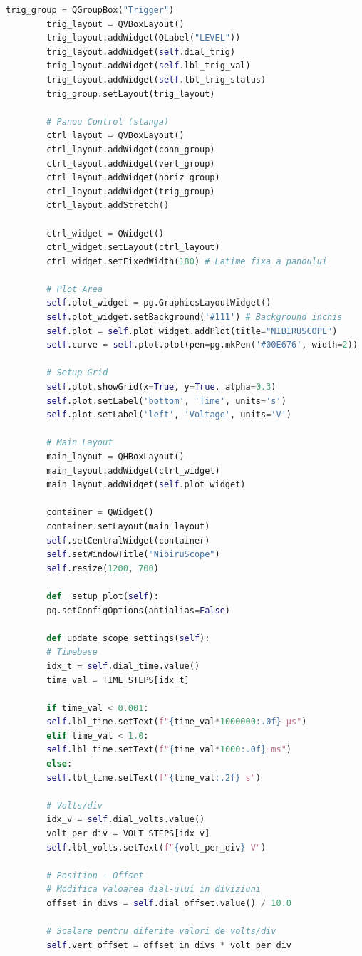 \documentclass[12pt,a4paper]{report}
\begin{document}
\begin{lstlisting}[language=Python]
		trig_group = QGroupBox("Trigger")
		trig_layout = QVBoxLayout()
		trig_layout.addWidget(QLabel("LEVEL"))
		trig_layout.addWidget(self.dial_trig)
		trig_layout.addWidget(self.lbl_trig_val)
		trig_layout.addWidget(self.lbl_trig_status)
		trig_group.setLayout(trig_layout)
		
		# Panou Control (stanga)
		ctrl_layout = QVBoxLayout()
		ctrl_layout.addWidget(conn_group)
		ctrl_layout.addWidget(vert_group)
		ctrl_layout.addWidget(horiz_group)
		ctrl_layout.addWidget(trig_group)
		ctrl_layout.addStretch()
		
		ctrl_widget = QWidget()
		ctrl_widget.setLayout(ctrl_layout)
		ctrl_widget.setFixedWidth(180) # Latime fixa a panoului
		
		# Plot Area
		self.plot_widget = pg.GraphicsLayoutWidget()
		self.plot_widget.setBackground('#111') # Background inchis
		self.plot = self.plot_widget.addPlot(title="NIBIRUSCOPE")
		self.curve = self.plot.plot(pen=pg.mkPen('#00E676', width=2)) 
		
		# Setup Grid
		self.plot.showGrid(x=True, y=True, alpha=0.3)
		self.plot.setLabel('bottom', 'Time', units='s')
		self.plot.setLabel('left', 'Voltage', units='V')
		
		# Main Layout
		main_layout = QHBoxLayout()
		main_layout.addWidget(ctrl_widget)
		main_layout.addWidget(self.plot_widget)
		
		container = QWidget()
		container.setLayout(main_layout)
		self.setCentralWidget(container)
		self.setWindowTitle("NibiruScope")
		self.resize(1200, 700)
		
		def _setup_plot(self):
		pg.setConfigOptions(antialias=False) 
		
		def update_scope_settings(self):
		# Timebase
		idx_t = self.dial_time.value()
		time_val = TIME_STEPS[idx_t]
		
		if time_val < 0.001:
		self.lbl_time.setText(f"{time_val*1000000:.0f} µs")
		elif time_val < 1.0:
		self.lbl_time.setText(f"{time_val*1000:.0f} ms")
		else:
		self.lbl_time.setText(f"{time_val:.2f} s")
		
		# Volts/div
		idx_v = self.dial_volts.value()
		volt_per_div = VOLT_STEPS[idx_v]
		self.lbl_volts.setText(f"{volt_per_div} V")
		
		# Position - Offset
		# Modifica valoarea dial-ului in diviziuni
		offset_in_divs = self.dial_offset.value() / 10.0
		
		# Scalare pentru diferite valori de volts/div
		self.vert_offset = offset_in_divs * volt_per_div 
		

\end{lstlisting}
\end{document}
